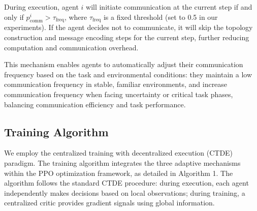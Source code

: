 \documentclass[10pt, twocolumn]{IEEEtran}
\begin{document}
During execution, agent $i$ will initiate communication at the current step if and only if $p_{\text{comm}}^i > \tau_{\text{freq}}$, where $\tau_{\text{freq}}$ is a fixed threshold (set to 0.5 in our experiments). If the agent decides not to communicate, it will skip the topology construction and message encoding steps for the current step, further reducing computation and communication overhead.

This mechanism enables agents to automatically adjust their communication frequency based on the task and environmental conditions: they maintain a low communication frequency in stable, familiar environments, and increase communication frequency when facing uncertainty or critical task phases, balancing communication efficiency and task performance.

\subsection{Training Algorithm}
We employ the centralized training with decentralized execution (CTDE) paradigm. The training algorithm integrates the three adaptive mechanisms within the PPO optimization framework, as detailed in Algorithm 1. The algorithm follows the standard CTDE procedure: during execution, each agent independently makes decisions based on local observations; during training, a centralized critic provides gradient signals using global information.
\end{document}
